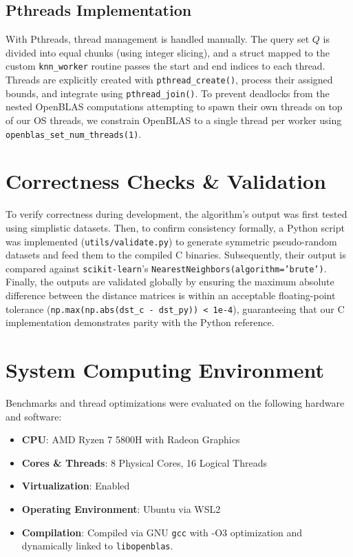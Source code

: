 \documentclass[12pt,a4paper]{article}
\begin{document}
\subsection{Pthreads Implementation}
With Pthreads, thread management is handled manually. The query set $Q$ is divided into equal chunks (using integer slicing), and a struct mapped to the custom \texttt{knn\_worker} routine passes the start and end indices to each thread. Threads are explicitly created with \texttt{pthread\_create()}, process their assigned bounds, and integrate using \texttt{pthread\_join()}. To prevent deadlocks from the nested OpenBLAS computations attempting to spawn their own threads on top of our OS threads, we constrain OpenBLAS to a single thread per worker using \texttt{openblas\_set\_num\_threads(1)}.

\section{Correctness Checks \& Validation}
To verify correctness during development, the algorithm's output was first tested using simplistic datasets. Then, to confirm consistency formally, a Python script was implemented (\texttt{utils/validate.py}) to generate symmetric pseudo-random datasets and feed them to the compiled C binaries. Subsequently, their output is compared against \texttt{scikit-learn}'s \texttt{NearestNeighbors(algorithm='brute')}. Finally, the outputs are validated globally by ensuring the maximum absolute difference between the distance matrices is within an acceptable floating-point tolerance (\texttt{np.max(np.abs(dst\_c - dst\_py)) < 1e-4}), guaranteeing that our C implementation demonstrates parity with the Python reference.

\section{System Computing Environment}
Benchmarks and thread optimizations were evaluated on the following hardware and software:
\begin{itemize}
    \item \textbf{CPU}: AMD Ryzen 7 5800H with Radeon Graphics 
    \item \textbf{Cores \& Threads}: 8 Physical Cores, 16 Logical Threads
    \item \textbf{Virtualization}: Enabled 
    \item \textbf{Operating Environment}: Ubuntu via WSL2
    \item \textbf{Compilation}: Compiled via GNU \texttt{gcc} with -O3 optimization and dynamically linked to \texttt{libopenblas}.
\end{itemize}
\end{document}
